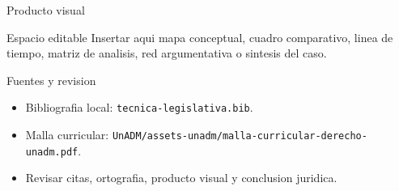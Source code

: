 \documentclass[
  spanish,
  aspectratio=169,
  xcolor={dvipsnames,table}
]{beamer}
\begin{document}
\begin{frame}{Producto visual}
  \begin{block}{Espacio editable}
    Insertar aqui mapa conceptual, cuadro comparativo, linea de tiempo,
    matriz de analisis, red argumentativa o sintesis del caso.
  \end{block}
  \centering
\end{frame}

\begin{frame}{Fuentes y revision}
  \begin{itemize}
    \item Bibliografia local: \texttt{tecnica-legislativa.bib}.
    \item Malla curricular: \texttt{UnADM/assets-unadm/malla-curricular-derecho-unadm.pdf}.
    \item Revisar citas, ortografia, producto visual y conclusion juridica.
  \end{itemize}
\end{frame}
\end{document}
